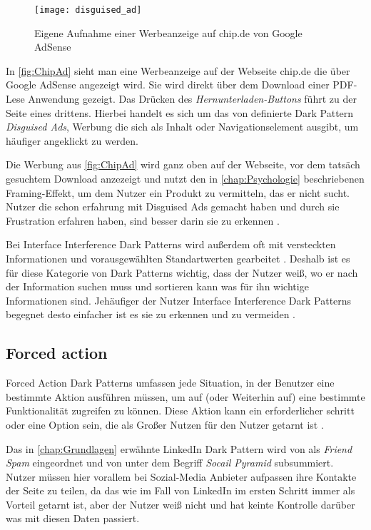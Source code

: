 \documentclass[conference,compsoc,final,a4paper]{IEEEtran}
\begin{document}
\begin{figure}[!ht]
  \centering
  \texttt{[image: disguised\_ad]}
  \caption{Eigene Aufnahme einer Werbeanzeige auf chip.de von Google AdSense~\autocite{ChipAd}}
  \label{fig:ChipAd}
\end{figure}

In \autoref{fig:ChipAd} sieht man eine Werbeanzeige auf der Webseite chip.de die über Google AdSense angezeigt wird. Sie wird direkt über dem Download einer PDF-Lese Anwendung gezeigt. Das Drücken des \textit{Hernunterladen-Buttons} führt zu der Seite eines drittens. Hierbei handelt es sich um das von \citeauthor{Brignull} \autocite{Brignull} definierte Dark Pattern \textit{Disguised Ads}, Werbung die sich als Inhalt oder Navigationselement ausgibt, um häufiger angeklickt zu werden.

Die Werbung aus \autoref{fig:ChipAd} wird ganz oben auf der Webseite, vor dem tatsäch gesuchtem Download anzezeigt und nutzt den in \autoref{chap:Psychologie} beschriebenen Framing-Effekt, um dem Nutzer ein Produkt zu vermitteln, das er nicht sucht. Nutzer die schon erfahrung mit Disguised Ads gemacht haben und durch sie Frustration erfahren haben, sind besser darin sie zu erkennen \autocite{M.Bhoot2020}.

Bei Interface Interference Dark Patterns wird außerdem oft mit versteckten Informationen und vorausgewählten Standartwerten gearbeitet \autocite{Gray_2018}. Deshalb ist es für diese Kategorie von Dark Patterns wichtig, dass der Nutzer weiß, wo er nach der Information suchen muss und sortieren kann was für ihn wichtige Informationen sind. Jehäufiger der Nutzer Interface Interference Dark Patterns begegnet desto einfacher ist es sie zu erkennen und zu vermeiden \autocite{M.Bhoot2020}.

\subsection{Forced action}
Forced Action Dark Patterns umfassen jede Situation, in der Benutzer eine bestimmte Aktion ausführen müssen, um auf (oder Weiterhin auf) eine bestimmte Funktionalität zugreifen zu können. Diese Aktion kann ein erforderlicher schritt oder eine Option sein, die als Großer Nutzen für den Nutzer getarnt ist \autocite{Gray_2018}.

Das in \autoref{chap:Grundlagen} erwähnte LinkedIn Dark Pattern wird von \citeauthor{Brignull} \autocite{Brignull} als \textit{Friend Spam} eingeordnet und von \citeauthor{Gray_2018} \autocite{Gray_2018} unter dem Begriff \textit{Socail Pyramid} subsummiert. Nutzer müssen hier vorallem bei Sozial-Media Anbieter aufpassen ihre Kontakte der Seite zu teilen, da das wie im Fall von LinkedIn im ersten Schritt immer als Vorteil getarnt ist, aber der Nutzer weiß nicht und hat keinte Kontrolle darüber was mit diesen Daten passiert.
\end{document}
